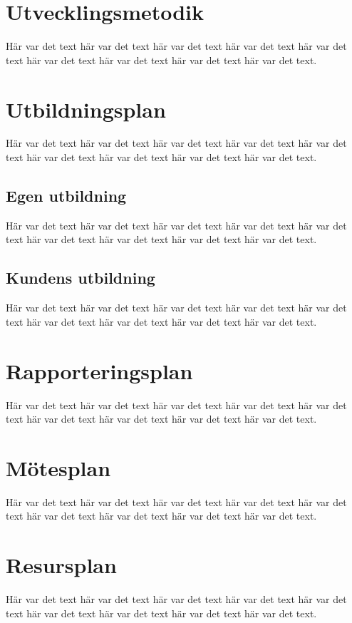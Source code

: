 \documentclass[a4paper,titlepage,12pt]{article}
\begin{document}
	
	\section{Utvecklingsmetodik}
	Här var det text här var det text här var det text
	här var det text här var det text här var det text
	här var det text här var det text här var det text.
	
	
	\section{Utbildningsplan}
	Här var det text här var det text här var det text
	här var det text här var det text här var det text
	här var det text här var det text här var det text.
	
	
	\subsection{Egen utbildning}
	Här var det text här var det text här var det text
	här var det text här var det text här var det text
	här var det text här var det text här var det text.
	
	
	\subsection{Kundens utbildning}
	Här var det text här var det text här var det text
	här var det text här var det text här var det text
	här var det text här var det text här var det text.
	
	
	\section{Rapporteringsplan}
	Här var det text här var det text här var det text
	här var det text här var det text här var det text
	här var det text här var det text här var det text.
	
	
	\section{Mötesplan}
	Här var det text här var det text här var det text
	här var det text här var det text här var det text
	här var det text här var det text här var det text.
	
	
	\section{Resursplan}
	Här var det text här var det text här var det text
	här var det text här var det text här var det text
	här var det text här var det text här var det text.
	
\end{document}
